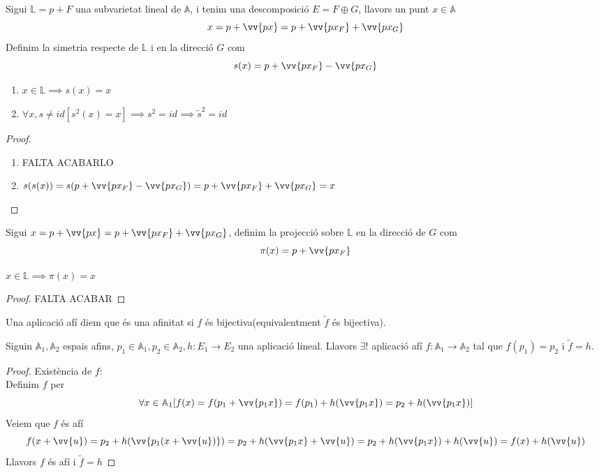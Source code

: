 \begin{defn}
	Sigui $\mathbb{L}=p+F$ una subvarietat lineal de $\mathbb{A}$, i tenim una descomposició $E=F\oplus G$, llavors un punt $x\in \mathbb{A}$
	\[x=p+\vv{px}=p+\vv{px_F}+\vv{px_G}\]
	Definim la simetria respecte de $\mathbb{L}$ i en la direcció $G$ com
	\[s(x)=p+\vv{px_F}-\vv{px_G}\]
\end{defn}

\begin{prop}\begin{enumerate}
	\item $x\in\mathbb{L}\implies s(x)=x$
	\item $\forall x, s\neq id[s^2(x)=x]\implies s^2=id\implies \widetilde{s}^2=id$
\end{enumerate}\end{prop}
\begin{proof}\begin{enumerate}
	\item FALTA ACABARLO
	\item $s(s(x))=s(p+\vv{px_F}-\vv{px_G})=p+\vv{px_F}+\vv{px_G}=x$
\end{enumerate}\end{proof}

\begin{defn}
	Sigui $x=p+\vv{px}=p+\vv{px_F}+\vv{px_G}$, definim la projecció sobre $\mathbb{L}$ en la direcció de $G$ com
	\[\pi (x)=p+\vv{px_F}\]
\end{defn}

\begin{prop}
	$x\in\mathbb{L}\implies\pi (x)=x$
\end{prop}
\begin{proof}
	FALTA ACABAR
\end{proof}

\begin{defn}
	Una aplicació afí diem que és una afinitat si $f$ és bijectiva(equivalentment $\widetilde{f}$ és bijectiva).
\end{defn}

\begin{prop}
	Siguin $\mathbb{A}_1,\mathbb{A}_2$ espais afins, $p_1\in\mathbb{A}_1,p_2\in\mathbb{A}_2, h:E_1\to E_2$ una aplicació lineal. Llavors $\exists !$ aplicació afí $f:\mathbb{A}_1\to\mathbb{A}_2$ tal que $f(p_1)=p_2$ i $\widetilde{f}=h$.
\end{prop}
\begin{proof}
	Existència de $f$: \\
	Definim $f$ per
	\[\forall x\in\mathbb{A}_1[f(x)=f(p_1+\vv{p_1x})=f(p_1)+h(\vv{p_1x})=p_2+h(\vv{p_1x})]\]
	Veiem que $f$ és afí
	\[f(x+\vv{u})=p_2+h(\vv{p_1(x+\vv{u})})=p_2+h(\vv{p_1x}+\vv{u})=p_2+h(\vv{p_1x})+h(\vv{u})=f(x)+h(\vv{u})\]
	Llavors $f$ és afí i $\widetilde{f}=h$
\end{proof}

